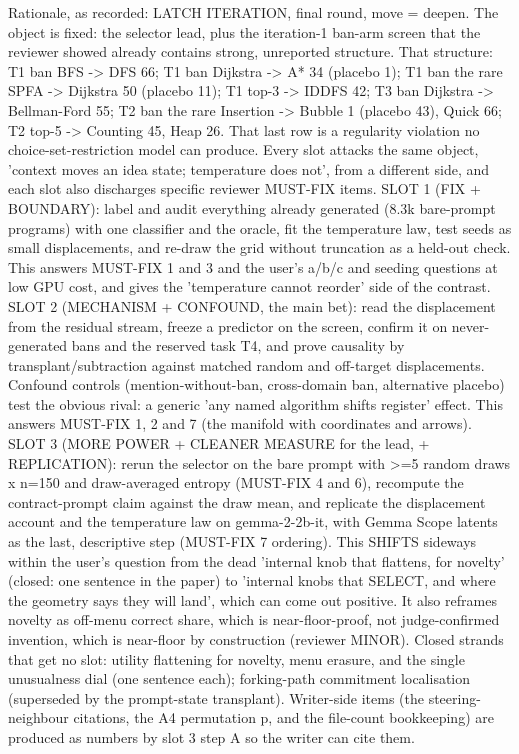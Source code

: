 \documentclass[11pt,letterpaper]{article}
\begin{document}
Rationale, as recorded: LATCH ITERATION, final round, move = deepen. The object is fixed: the selector lead, plus the iteration-1 ban-arm screen that the reviewer showed already contains strong, unreported structure. That structure: T1 ban BFS -\textgreater{} DFS 66; T1 ban Dijkstra -\textgreater{} A* 34 (placebo 1); T1 ban the rare SPFA -\textgreater{} Dijkstra 50 (placebo 11); T1 top-3 -\textgreater{} IDDFS 42; T3 ban Dijkstra -\textgreater{} Bellman-Ford 55; T2 ban the rare Insertion -\textgreater{} Bubble 1 (placebo 43), Quick 66; T2 top-5 -\textgreater{} Counting 45, Heap 26. That last row is a regularity violation no choice-set-restriction model can produce. Every slot attacks the same object, 'context moves an idea state; temperature does not', from a different side, and each slot also discharges specific reviewer MUST-FIX items. SLOT 1 (FIX + BOUNDARY): label and audit everything already generated (8.3k bare-prompt programs) with one classifier and the oracle, fit the temperature law, test seeds as small displacements, and re-draw the grid without truncation as a held-out check. This answers MUST-FIX 1 and 3 and the user's a/b/c and seeding questions at low GPU cost, and gives the 'temperature cannot reorder' side of the contrast. SLOT 2 (MECHANISM + CONFOUND, the main bet): read the displacement from the residual stream, freeze a predictor on the screen, confirm it on never-generated bans and the reserved task T4, and prove causality by transplant/subtraction against matched random and off-target displacements. Confound controls (mention-without-ban, cross-domain ban, alternative placebo) test the obvious rival: a generic 'any named algorithm shifts register' effect. This answers MUST-FIX 1, 2 and 7 (the manifold with coordinates and arrows). SLOT 3 (MORE POWER + CLEANER MEASURE for the lead, + REPLICATION): rerun the selector on the bare prompt with \textgreater{}=5 random draws x n=150 and draw-averaged entropy (MUST-FIX 4 and 6), recompute the contract-prompt claim against the draw mean, and replicate the displacement account and the temperature law on gemma-2-2b-it, with Gemma Scope latents as the last, descriptive step (MUST-FIX 7 ordering). This SHIFTS sideways within the user's question from the dead 'internal knob that flattens, for novelty' (closed: one sentence in the paper) to 'internal knobs that SELECT, and where the geometry says they will land', which can come out positive. It also reframes novelty as off-menu correct share, which is near-floor-proof, not judge-confirmed invention, which is near-floor by construction (reviewer MINOR). Closed strands that get no slot: utility flattening for novelty, menu erasure, and the single unusualness dial (one sentence each); forking-path commitment localisation (superseded by the prompt-state transplant). Writer-side items (the steering-neighbour citations, the A4 permutation p, and the file-count bookkeeping) are produced as numbers by slot 3 step A so the writer can cite them.
\end{document}
